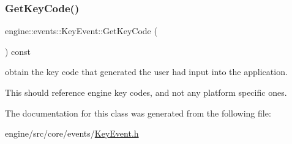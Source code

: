 \subsubsection{\texorpdfstring{Get\+Key\+Code()}{GetKeyCode()}}
{\footnotesize\ttfamily engine\+::events\+::\+Key\+Event\+::\+Get\+Key\+Code (\begin{DoxyParamCaption}{ }\end{DoxyParamCaption}) const\hspace{0.3cm}{\ttfamily [inline]}}



obtain the key code that generated the user had input into the application. 

This should reference engine key codes, and not any platform specific ones. 

The documentation for this class was generated from the following file\+:\begin{DoxyCompactItemize}
\item 
engine/src/core/events/\hyperlink{KeyEvent_8h}{Key\+Event.\+h}\end{DoxyCompactItemize}
